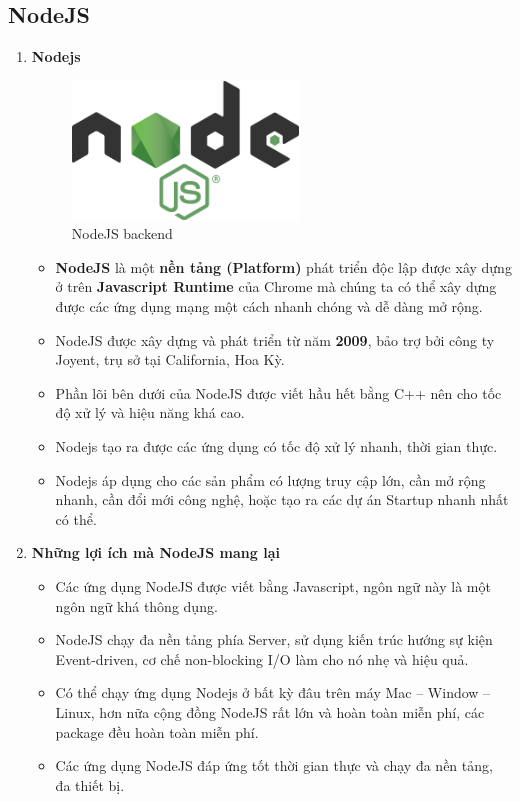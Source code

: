 \subsection{NodeJS}
\begin{enumerate}
    \item \textbf{Nodejs}
    \begin{figure}[H]
        \centering
        \includegraphics[width = 6cm]{image/nodejs-logo.png}
        \caption{NodeJS backend}
        \label{fig:nodejs_logo}
    \end{figure}
    \begin{itemize}
        \item \textbf{NodeJS} là một \textbf{nền tảng (Platform)} phát triển độc lập được xây dựng ở trên \textbf{Javascript Runtime} của Chrome mà chúng ta có thể xây dựng được các ứng dụng mạng một cách nhanh chóng và dễ dàng mở rộng.
        \item NodeJS được xây dựng và phát triển từ năm \textbf{2009}, bảo trợ bởi công ty Joyent, trụ sở tại California, Hoa Kỳ.
        \item Phần lõi bên dưới của NodeJS được viết hầu hết bằng C++ nên cho tốc độ xử lý và hiệu năng khá cao.
        \item Nodejs tạo ra được các ứng dụng có tốc độ xử lý nhanh, thời gian thực.
        \item Nodejs áp dụng cho các sản phẩm có lượng truy cập lớn, cần mở rộng nhanh, cần đổi mới công nghệ, hoặc tạo ra các dự án Startup nhanh nhất có thể.
    \end{itemize}
    \item \textbf{Những lợi ích mà NodeJS mang lại}
    \begin{itemize}
        \item Các ứng dụng NodeJS được viết bằng Javascript, ngôn ngữ này là một ngôn ngữ khá thông dụng.
        \item NodeJS chạy đa nền tảng phía Server, sử dụng kiến trúc hướng sự kiện Event-driven, cơ chế non-blocking I/O làm cho nó nhẹ và hiệu quả.
        \item Có thể chạy ứng dụng Nodejs ở bất kỳ đâu trên máy Mac – Window – Linux, hơn nữa cộng đồng NodeJS rất lớn và hoàn toàn miễn phí, các package đều hoàn toàn miễn phí.
        \item Các ứng dụng NodeJS đáp ứng tốt thời gian thực và chạy đa nền tảng, đa thiết bị.
    \end{itemize}
\end{enumerate}
